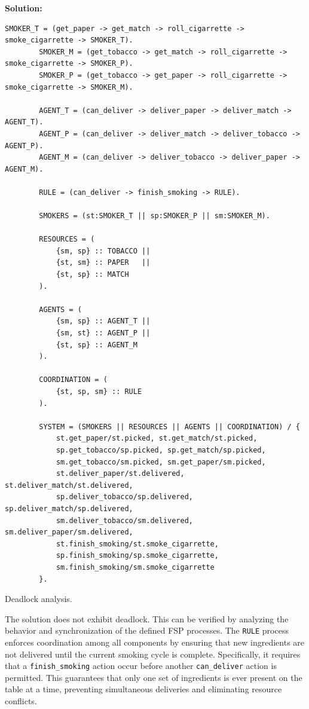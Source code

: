 \documentclass{article}
\makeatletter
\newenvironment{solution}{
	\vspace{0.4cm}\par\noindent\large\textbf{{Solution:}}\par\vspace{1em}
}{\vspace{0.1em}}
\newcounter{currentstep}
\renewcommand{\thecurrentstep}{\Roman{currentstep}}
\newenvironment{steps}{
	\let\steps@olditem\item
	\begin{list}{}{
		\setlength\leftmargin{3.15em}
		\setlength\itemsep{0.4em}
		\setlength\topsep{0.8em}
	}
	\renewcommand{\item}{
		\stepcounter{currentstep}
		\steps@olditem[\textbf{(\thecurrentstep)}]
	}
}{
	\end{list}
	\let\item\steps@olditem
}
\makeatother
\begin{document}
\begin{solution}
\begin{lstlisting}[language={}, caption={Expanded FSP specification of smokers' problem}, label={lst:smokers1}]
		SMOKER_T = (get_paper -> get_match -> roll_cigarrette -> smoke_cigarrette -> SMOKER_T).
		SMOKER_M = (get_tobacco -> get_match -> roll_cigarrette -> smoke_cigarrette -> SMOKER_P).
		SMOKER_P = (get_tobacco -> get_paper -> roll_cigarrette -> smoke_cigarrette -> SMOKER_M).
		
		AGENT_T = (can_deliver -> deliver_paper -> deliver_match -> AGENT_T).
		AGENT_P = (can_deliver -> deliver_match -> deliver_tobacco -> AGENT_P).
		AGENT_M = (can_deliver -> deliver_tobacco -> deliver_paper -> AGENT_M).
		
		RULE = (can_deliver -> finish_smoking -> RULE).
		
		SMOKERS = (st:SMOKER_T || sp:SMOKER_P || sm:SMOKER_M).
		
		RESOURCES = (
		    {sm, sp} :: TOBACCO ||
		    {st, sm} :: PAPER   ||
		    {st, sp} :: MATCH
		).
		
		AGENTS = (
		    {sm, sp} :: AGENT_T ||
		    {sm, st} :: AGENT_P ||
		    {st, sp} :: AGENT_M
		).
		
		COORDINATION = (
		    {st, sp, sm} :: RULE
		).
		
		SYSTEM = (SMOKERS || RESOURCES || AGENTS || COORDINATION) / {
		    st.get_paper/st.picked, st.get_match/st.picked,
		    sp.get_tobacco/sp.picked, sp.get_match/sp.picked,
		    sm.get_tobacco/sm.picked, sm.get_paper/sm.picked,
		    st.deliver_paper/st.delivered, st.deliver_match/st.delivered,
		    sp.deliver_tobacco/sp.delivered, sp.deliver_match/sp.delivered,
		    sm.deliver_tobacco/sm.delivered, sm.deliver_paper/sm.delivered,
		    st.finish_smoking/st.smoke_cigarrette,
		    sp.finish_smoking/sp.smoke_cigarrette,
		    sm.finish_smoking/sm.smoke_cigarrette
		}.
	\end{lstlisting}

	\begin{steps}
		\item Deadlock analysis.
	\end{steps}

	The solution does not exhibit deadlock. This can be verified by analyzing the behavior and synchronization of the defined FSP processes. The \texttt{RULE} process enforces coordination among all components by ensuring that new ingredients are not delivered until the current smoking cycle is complete. Specifically, it requires that a \texttt{finish\_smoking} action occur before another \texttt{can\_deliver} action is permitted. This guarantees that only one set of ingredients is ever present on the table at a time, preventing simultaneous deliveries and eliminating resource conflicts.
	

\end{solution}
\end{document}
